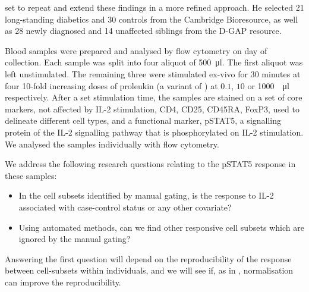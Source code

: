  set to repeat and extend these findings in a more refined approach.
He selected 21 long-standing diabetics and 30 controls from the Cambridge Bioresource, as well as 
28 newly diagnosed and 14 unaffected siblings from the \Gls{D-GAP} resource.  


Blood samples were prepared and analysed by flow cytometry on day of collection.
Each sample was split into four aliquot of \SI{500}{\micro\litre}.
The first aliquot was left unstimulated.
The remaining three were stimulated ex-vivo for 30 minutes at four 10-fold increasing doses
of proleukin (a variant of ) at $0.1$, $10$ or \SI{1000}{\unit\per\micro\litre} respectively.
After a set stimulation time, the samples are stained on a set of core markers, not affected by IL-2 stimulation, CD4, CD25, CD45RA, FoxP3,
used to delineate different cell types, and a functional marker, pSTAT5, a signalling protein of the IL-2 signalling pathway
that is phosphorylated on IL-2 stimulation.
We analysed the samples individually with flow cytometry.

We address the following research questions relating to the pSTAT5 response in these samples:
\begin{itemize}
  \item In the cell subsets identified by manual gating, is the response to IL-2 associated with case-control status or any other covariate? 
  \item Using automated methods, can we find other responsive cell subsets which are ignored by the manual gating?
\end{itemize}

Answering the first question will depend on the reproducibility of the response between cell-subsets within individuals,
and we will see if, as in , normalisation can improve the reproducibility.


